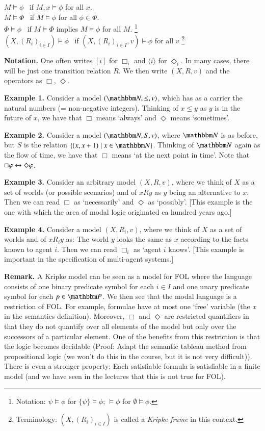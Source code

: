 \noindent $M\models\phi$ \ if $M,x\models\phi$ for all $x$.\\
$M\models\Phi$ \ if $M\models\phi$ for all $\phi\in\Phi$.\\
$\Phi\models\phi$ \  if $M\models\Phi$ implies $M\models\phi$ for all $M$. \footnote{Notation: $\psi\models\phi$ for $\{\psi\}\models\phi$; $\models\phi$ for $\emptyset\models\phi$.} \\
$(X,(R_i)_{i\in I})\models\phi$ \ if $(X,(R_i)_{i\in I},v)\models\phi$
for all $v$ \footnote{Terminology: $(X,(R_i)_{i\in I})$ is called a
  \emph{Kripke frame} in this context.}

\bigskip\noindent\textbf{Notation. } One often writes $[i]$ for
$\Box_i$ and $\langle i\rangle$ for $\Diamond_i$. In many cases, there
will be just one transition relation $R$. We then write $(X,R,v)$ and
the operators as $\Box$, $\Diamond$.

\bigskip\noindent\textbf{Example 1. } Consider a model $(\bbN,\le,v)$,
which has as a carrier the natural numbers (= non-negative integers).
Thinking of $x\le y$ as $y$ is in the future of $x$, we have that
$\Box$ means `always' and $\Diamond$ means `sometimes'.

\bigskip\noindent\textbf{Example 2. } Consider a model $(\bbN,S,v)$,
where $\bbN$ is as before, but $S$ is the relation $\{(x,x+1) \mid
x\in \bbN\}$. Thinking of $\bbN$ again as the flow of time, we have
that $\Box$ means `at the next point in time'. Note that
$\Box\varphi\leftrightarrow \Diamond\varphi$.

\bigskip\noindent\textbf{Example 3. } Consider an arbitrary model
$(X,R,v)$, where we think of $X$ as a set of worlds (or possible
scenarios) and of $xRy$ as $y$ being an alternative to $x$. Then we
can read $\Box$ as `necessarily' and $\Diamond$ as `possibly'. [This
example is the one with which the area of modal logic originated ca
hundred years ago.]

\bigskip\noindent\textbf{Example 4. } Consider a model $(X,R_i,v)$,
where we think of $X$ as a set of worlds and of $xR_iy$ as: The world
$y$ looks the same as $x$ according to the facts known to agent $i$.
Then we can read $\Box_i$ as `agent $i$ knows'. [This example is
important in the specification of multi-agent systems.]




\bigskip\noindent\textbf{Remark. } A Kripke model can be seen as a
model for FOL where the language consists of one binary predicate
symbol for each $i\in I$ and one unary predicate symbol for each
$p\in\bbP$. We then see that the modal language is a restriction of
FOL. For example, formulae have at most one `free' variable (the $x$
in the semantics definition). Moreover, $\Box$ and $\Diamond$ are
restricted quantifiers in that they do not quantify over all elements
of the model but only over the successors of a particular element. One
of the benefits from this restriction is that the logic becomes
decidable (Proof: Adapt the semantic tableau method from propositional
logic (we won't do this in the course, but it is not very difficult)).
There is even a stronger property: Each satisfiable formula is
satisfiable in a finite model (and we have seen in the lectures that
this is not true for FOL).
